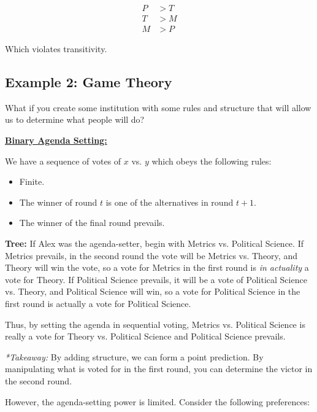\documentclass{article}
\begin{document}
\begin{align*}
P &> T \\
T&>M\\
M&>P
\end{align*}

Which violates transitivity.

\subsection*{Example 2: Game Theory}

What if you create some institution with some rules and structure that will allow us to determine what people will do? 

\textbf{\underline{Binary Agenda Setting:}}

We have a sequence of votes of $x$ vs. $y$ which obeys the following rules:

\begin{itemize}

\item Finite.

\item The winner of round $t$ is one of the alternatives in round $t+1$.

\item The winner of the final round prevails.
\end{itemize}
\textbf{Tree:} If Alex was the agenda-setter, begin with Metrics vs. Political Science. If Metrics prevails, in the second round the vote will be Metrics vs. Theory, and Theory will win the vote, so a vote for Metrics in the first round is \emph{in actuality} a vote for Theory. If Political Science prevails, it will be a vote of Political Science vs. Theory, and Political Science will win, so a vote for Political Science in the first round is actually a vote for Political Science.

Thus, by setting the agenda in sequential voting, Metrics vs. Political Science is really a vote for Theory vs. Political Science and Political Science prevails.  %

\emph{*Takeaway:} By adding structure, we can form a point prediction. By manipulating what is voted for in the first round, you can determine the victor in the second round.

However, the agenda-setting power is limited. Consider the following preferences:
\end{document}
